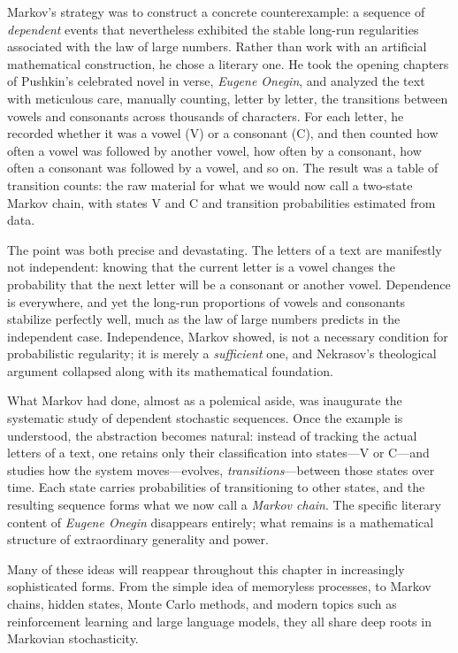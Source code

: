 \medskip

Markov's strategy was to construct a concrete counterexample: a sequence of \textit{dependent} events that nevertheless exhibited the stable long-run regularities associated with the law of large numbers. Rather than work with an artificial mathematical construction, he chose a literary one. He took the opening chapters of Pushkin's celebrated novel in verse, \textit{Eugene Onegin}, and analyzed the text with meticulous care, manually counting, letter by letter, the transitions between vowels and consonants across thousands of characters. For each letter, he recorded whether it was a vowel (V) or a consonant (C), and then counted how often a vowel was followed by another vowel, how often by a consonant, how often a consonant was followed by a vowel, and so on. The result was a table of transition counts: the raw material for what we would now call a two-state Markov chain, with states V and C and transition probabilities estimated from data.

\medskip

The point was both precise and devastating. The letters of a text are manifestly not independent: knowing that the current letter is a vowel changes the probability that the next letter will be a consonant or another vowel. Dependence is everywhere, and yet the long-run proportions of vowels and consonants stabilize perfectly well, much as the law of large numbers predicts in the independent case. Independence, Markov showed, is not a necessary condition for probabilistic regularity; it is merely a \textit{sufficient} one, and Nekrasov's theological argument collapsed along with its mathematical foundation.

\medskip

What Markov had done, almost as a polemical aside, was inaugurate the systematic study of dependent stochastic sequences. Once the example is understood, the abstraction becomes natural: instead of tracking the actual letters of a text, one retains only their classification into states---V or C---and studies how the system moves—evolves, \textit{transitions}—between those states over time. Each state carries probabilities of transitioning to other states, and the resulting sequence forms what we now call a \textit{Markov chain}. The specific literary content of \textit{Eugene Onegin} disappears entirely; what remains is a mathematical structure of extraordinary generality and power.

\medskip

Many of these ideas will reappear throughout this chapter in increasingly sophisticated forms. From the simple idea of memoryless processes, to Markov chains, hidden states, Monte Carlo methods, and modern topics such as reinforcement learning and large language models, they all share deep roots in Markovian stochasticity.

